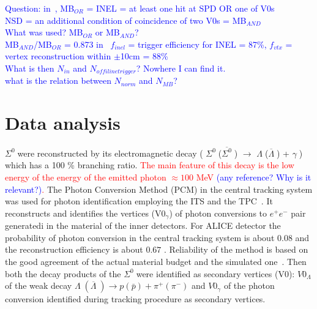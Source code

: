 \documentclass[ALICE,manyauthors]{cernphprep}
\newcommand{\sig}{\ensuremath{\Sigma^0  \; }}
\newcommand{\asig}{\ensuremath{\overline{\Sigma^0} \; }}
\newcommand{\gam}{\ensuremath{\gamma \; }}
\newcommand{\lam}{\ensuremath{\Lambda \; }}
\newcommand{\alam}{\ensuremath{\overline{\Lambda} \; }}
\newcommand{\red}{\textcolor{red}}
\newcommand{\blue}{\textcolor{blue}}
\begin{document}
\blue{Question: 
in~\cite{cite:ALICE2015-InclPhot-pp}, MB$_{OR}$ = INEL = at least one hit at SPD OR one of V0s\\
NSD = an additional condition of coincidence of two V0s = MB$_{AND}$\\
What was used? MB$_{OR}$ or MB$_{AND}$? \\
MB$_{AND}$/MB$_{OR}$ = 0.873
in~\cite{cite:NSD, cite:Xi_c} $f_{inel}$ = trigger efficiency for INEL = 87\%, $f_{vtx}$ = vertex reconstruction within $\pm$10cm = 88\%\\
What is then $N_{in}$ and $N_{offilinetrigger}$? Nowhere I can find it.\\
what is the relation between $N_{norm}$ and $N_{MB}$?}

 \section{Data analysis}
 \label{sec:analysis}

\sig  were reconstructed by its electromagnetic decay 
( \sig (\asig) $\to $ \lam (\alam) + \gam \;) which has a 100 \% branching ratio.  
\red{The main feature of this decay is the low energy of the energy of the emitted photon
$\approx 100$ MeV \blue{(any reference? Why is it relevant?)}.}
The Photon Conversion Method (PCM) in the central tracking system was used for photon identification 
employing the ITS and the TPC~\cite{cite:ALICEPerformance,cite:ALICE-DirPhot2016,cite:pi0-2012}.
It  reconstructs and identifies  the vertices (V0$_{\gamma}$) of photon conversions to $e^+ e^-$ pair generatedi in the
material of the inner detectors. For ALICE detector the  probability of photon conversion in the central tracking system is about 0.08 and the 
reconstruction efficiency  is about $0.67$ \cite{cite:pi0-2012}. Reliability of the method is based on the 
good agreement of the actual material budget and the simulated one~\cite{cite:ALICEPerformance}. 
Then both the decay products of the \sig were identified as secondary vertices (V0): $V0_{\Lambda}$ of 
the weak decay   $ \lam (\alam) \to p (\bar p) + \pi^+ (\pi^-)$ and $V0_{\gamma}$ of the photon conversion
identified during tracking procedure as secondary vertices.
\end{document}
